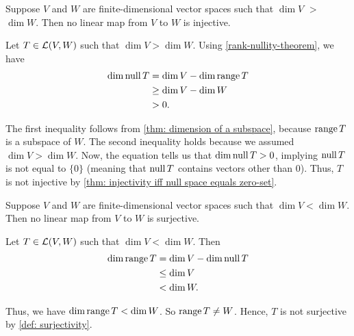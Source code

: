 \setcounter{thm}{21}
\begin{thm} 
  \label{thm: linear-map-to-a-lower-dimensional-space-is-not-injective}
  Suppose $V$ and $W$ are finite-dimensional vector spaces such that $\dim V$ $>$ $\dim W$.
  Then no linear map from $V$ to $W$ is injective.
\end{thm}
\begin{prf} Let $T\in \mathcal{L}(V,W)$ such that $\dim V > \dim W$. Using \ref{rank-nullity-theorem}, we have
  \begin{align}
    \dim \operatorname{null} T &= \dim V - \dim \operatorname{range} T \\
                   &\geq \dim V - \dim W  \\
                   &> 0.
  \end{align}

  The first inequality follows from \ref{thm: dimension of a subspace}, because $\operatorname{range} T$ is a subspace of $W$. The second inequality holds because we assumed $\dim V > \dim W$. Now, the equation tells us that $\dim \operatorname{null} T > 0$, implying $\operatorname{null} T$ is not equal to $\{0\}$ (meaning that $\operatorname{null} T$ contains vectors other than $0$). Thus, $T$ is not injective by \ref{thm: injectivity iff null space equals zero-set}.
\end{prf}

\begin{thm} 
  \label{thm: linear map to a higher-dimensional space is not surjective}
  Suppose $V$ and $W$ are finite-dimensional vector spaces such that $\dim V < \dim W$. Then no linear map from $V$ to $W$ is surjective.
\end{thm}
\begin{prf}
  Let $T\in \mathcal{L} (V,W)$ such that $\dim V < \dim W$. Then
  \begin{align}
    \dim \operatorname{range} T & = \dim V - \dim \operatorname{null} T \\
                    & \leq \dim V  \\
                    & < \dim W.
  \end{align}

  Thus, we have $\dim \operatorname{range} T < \dim W$. So $\operatorname{range} T \neq W$. Hence, $T$ is not surjective by \ref{def: surjectivity}.
\end{prf}

